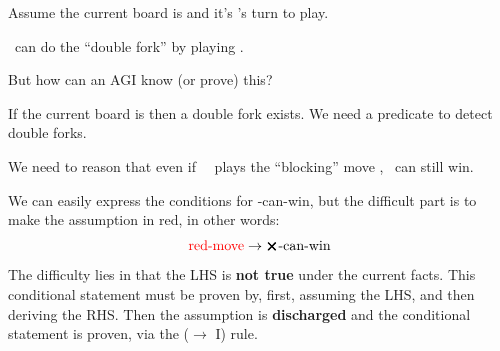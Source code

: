 \begin{tcolorbox}[breakable, parbox=false, fonttitle=\bfseries, title=Tic Tac Toe example]
	
	Assume the current board is
	 and it's \bX's turn to play.
	
	\bX \ can do the ``double fork'' by playing
	.
	
	But how can an AGI know (or prove) this?
	
	If the current board is 
	  then a double fork exists.  We need a predicate to detect double forks.
	
	We need to reason that even if \ \bO \ plays the ``blocking'' move
	  , \bX \ can still win.
	
	We can easily express the conditions for \bX-can-win, but the difficult part is to make the assumption in {\color{red}red}, in other words:
	\begin{equation}
	\mbox{{\color{red}red-move}} \rightarrow \mbox{$\pmb{\bm{\times}}$-can-win}
	\end{equation}
	The difficulty lies in that the LHS is \textbf{not true} under the current facts.  This conditional statement must be proven by, first, assuming the LHS, and then deriving the RHS.  Then the assumption is \textbf{discharged} and the conditional statement is proven, via the ($\rightarrow$ I) rule.
	
\end{tcolorbox}

